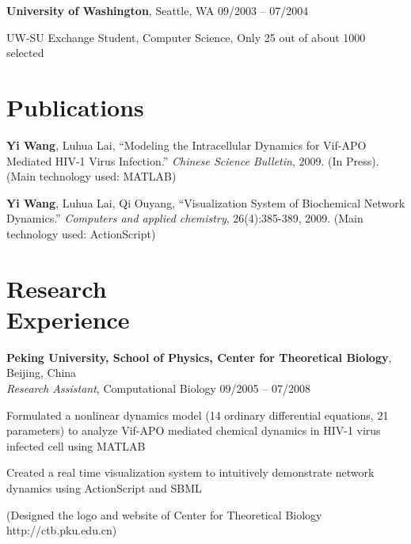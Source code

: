 \documentclass[margin,line]{resume}
\begin{document}
\begin{resume}
    \textbf{University of Washington}, Seattle, WA \hfill 09/2003 -- 07/2004 \vspace{-3mm}\\\vspace{-1mm}%
      \begin{list2}
       \item  UW-SU Exchange Student, Computer Science, Only 25 out of about 1000 selected
      \end{list2}


    \section{\mysidestyle Publications}

      \textbf{Yi Wang}, Luhua Lai, ``Modeling the Intracellular Dynamics for Vif-APO Mediated HIV-1 Virus Infection.''
      \textsl{Chinese Science Bulletin}, 2009. (In Press). (Main technology used: MATLAB) 

      \textbf{Yi Wang}, Luhua Lai, Qi Ouyang, ``Visualization System of Biochemical Network Dynamics.''
      \textsl{Computers and applied chemistry}, 26(4):385-389, 2009. (Main technology used: ActionScript)

    \section{\mysidestyle Research \\ Experience}

    \textbf{Peking University, School of Physics, Center for Theoretical Biology}, Beijing, China \\
    \textsl{Research Assistant}, Computational Biology \hfill 09/2005 -- 07/2008 \vspace{-3mm}\\\vspace{-1mm}%
      \begin{list2}
      \item Formulated a nonlinear dynamics model (14 ordinary differential equations, 21 parameters) to analyze Vif-APO mediated chemical dynamics in HIV-1 virus infected cell using MATLAB
      \item Created a real time visualization system to intuitively demonstrate network dynamics using ActionScript and SBML 
      \item (Designed the logo and website of Center for Theoretical Biology http://ctb.pku.edu.cn)
      \end{list2}


\end{resume}
\end{document}
